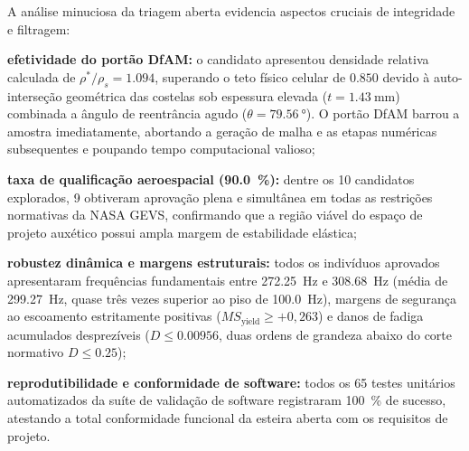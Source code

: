 A análise minuciosa da triagem aberta evidencia aspectos cruciais de integridade e filtragem:
\begin{alineas}
  \item \textbf{efetividade do portão DfAM:} o candidato  apresentou densidade relativa calculada de $\rho^* / \rho_s = \num{1.094}$, superando o teto físico celular de $\num{0.850}$ devido à auto-interseção geométrica das costelas sob espessura elevada ($t = \SI{1.43}{\milli\metre}$) combinada a ângulo de reentrância agudo ($\theta = \SI{79.56}{\degree}$). O portão DfAM barrou a amostra imediatamente, abortando a geração de malha e as etapas numéricas subsequentes e poupando tempo computacional valioso;
  \item \textbf{taxa de qualificação aeroespacial (\SI{90.0}{\percent}):} dentre os 10 candidatos explorados, 9 obtiveram aprovação plena e simultânea em todas as restrições normativas da NASA GEVS, confirmando que a região viável do espaço de projeto auxético possui ampla margem de estabilidade elástica;
  \item \textbf{robustez dinâmica e margens estruturais:} todos os indivíduos aprovados apresentaram frequências fundamentais entre \SI{272.25}{\hertz} e \SI{308.68}{\hertz} (média de \SI{299.27}{\hertz}, quase três vezes superior ao piso de \SI{100.0}{\hertz}), margens de segurança ao escoamento estritamente positivas ($MS_{\text{yield}} \ge +0{,}263$) e danos de fadiga acumulados desprezíveis ($D \le \num{0.00956}$, duas ordens de grandeza abaixo do corte normativo $D \le \num{0.25}$);
  \item \textbf{reprodutibilidade e conformidade de software:} todos os 65 testes unitários automatizados da suíte de validação de software registraram \SI{100}{\percent} de sucesso, atestando a total conformidade funcional da esteira aberta com os requisitos de projeto.
\end{alineas}
